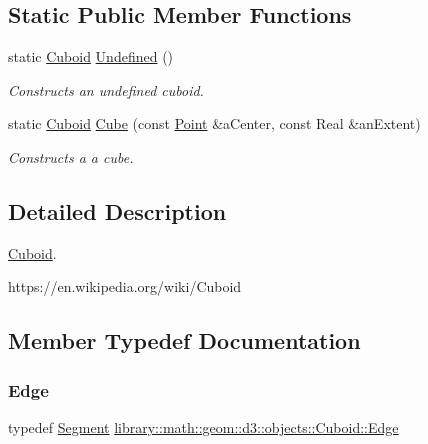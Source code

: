 \subsection*{Static Public Member Functions}
\begin{DoxyCompactItemize}
\item 
static \hyperlink{classlibrary_1_1math_1_1geom_1_1d3_1_1objects_1_1_cuboid}{Cuboid} \hyperlink{classlibrary_1_1math_1_1geom_1_1d3_1_1objects_1_1_cuboid_ae87cb41a6038e58e17553daa8270abab}{Undefined} ()
\begin{DoxyCompactList}\small\item\em Constructs an undefined cuboid. \end{DoxyCompactList}\item 
static \hyperlink{classlibrary_1_1math_1_1geom_1_1d3_1_1objects_1_1_cuboid}{Cuboid} \hyperlink{classlibrary_1_1math_1_1geom_1_1d3_1_1objects_1_1_cuboid_ac13abaa04f53ab22888ea6c0f697fbc8}{Cube} (const \hyperlink{classlibrary_1_1math_1_1geom_1_1d3_1_1objects_1_1_point}{Point} \&a\+Center, const Real \&an\+Extent)
\begin{DoxyCompactList}\small\item\em Constructs a a cube. \end{DoxyCompactList}\end{DoxyCompactItemize}


\subsection{Detailed Description}
\hyperlink{classlibrary_1_1math_1_1geom_1_1d3_1_1objects_1_1_cuboid}{Cuboid}. 

https\+://en.wikipedia.\+org/wiki/\+Cuboid 

\subsection{Member Typedef Documentation}
\mbox{\label{classlibrary_1_1math_1_1geom_1_1d3_1_1objects_1_1_cuboid_a743ee54e5fb8e2e649c254e69abed69c}} 
\subsubsection{\texorpdfstring{Edge}{Edge}}
{\footnotesize\ttfamily typedef \hyperlink{classlibrary_1_1math_1_1geom_1_1d3_1_1objects_1_1_segment}{Segment} \hyperlink{classlibrary_1_1math_1_1geom_1_1d3_1_1objects_1_1_cuboid_a743ee54e5fb8e2e649c254e69abed69c}{library\+::math\+::geom\+::d3\+::objects\+::\+Cuboid\+::\+Edge}}

